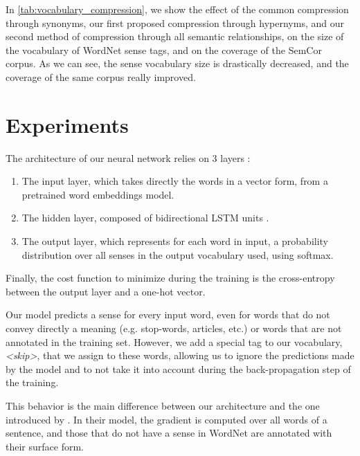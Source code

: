 \documentclass[11pt]{article}
\newcommand{\citep}[1]{\cite{#1}}
\begin{document}
In \autoref{tab:vocabulary_compression}, we show the effect of the common compression through synonyms,
our first proposed compression through hypernyms, and our second method of compression through all semantic relationships, on the size of the vocabulary of WordNet sense tags, and on the coverage of the SemCor corpus. 
As we can see, the sense vocabulary size is drastically decreased, and the coverage of the same corpus really improved.


\section{Experiments}









\iffalse
The architecture of our neural network relies on 3 layers :

\begin{enumerate}[leftmargin=*,topsep=0pt,itemsep=0pt,parsep=0pt,partopsep=0pt]
    \item The input layer, which takes directly the words in a vector form, from a pretrained word embeddings model.
    \item The hidden layer, composed of bidirectional LSTM units \citep{LSTM1997}. 
    \item The output layer, which represents for each word in input, a probability distribution over all senses in the output vocabulary used, using softmax.
\end{enumerate}

Finally, the cost function to minimize during the training is the cross-entropy between the output layer and a one-hot vector.

Our model predicts a sense for every input word, even for words that do not convey directly a meaning (e.g. stop-words, articles, etc.) or words that are not annotated in the training set. However, we add a special tag to our vocabulary, \textit{<skip>}, that we assign to these words, allowing us to ignore the predictions made by the model and to not take it into account during the back-propagation step of the training. 

This behavior is the main difference between our architecture and the one introduced by \cite{raganato2017}. In their model, the gradient is computed over all words of a sentence, and those that do not have a sense in WordNet are annotated with their surface form.
\end{document}

